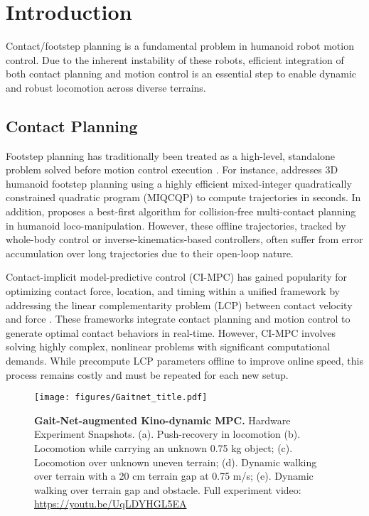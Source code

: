 
\section{Introduction}
\label{sec:Introduction}


Contact/footstep planning is a fundamental problem in humanoid robot motion control. Due to the inherent instability of these robots, 
efficient integration of both contact planning and motion control is an essential step to enable dynamic and robust locomotion across diverse terrains.

\subsection{Contact Planning}
Footstep planning has traditionally been treated as a high-level, standalone problem solved before motion control execution \cite{deits2014footstep, bouyarmane2012humanoid, carpentier2016versatile, ponton2021efficient}. For instance, \citet{deits2014footstep} addresses 3D humanoid footstep planning using a highly efficient mixed-integer quadratically constrained quadratic program (MIQCQP) to compute trajectories in seconds. In addition, \citet{bouyarmane2012humanoid} proposes a best-first algorithm for collision-free multi-contact planning in humanoid loco-manipulation. However, these offline trajectories, tracked by whole-body control or inverse-kinematics-based controllers, often suffer from error accumulation over long trajectories due to their open-loop nature.

Contact-implicit model-predictive control (CI-MPC) has gained popularity for optimizing contact force, location, and timing within a unified framework by addressing the linear complementarity problem (LCP) between contact velocity and force \cite{kim2023contact, le2024fast, kong2023hybrid}. These frameworks integrate contact planning and motion control to generate optimal contact behaviors in real-time. However, CI-MPC involves solving highly complex, nonlinear problems with significant computational demands. While \citet{le2024fast} precompute LCP parameters offline to improve online speed, this process remains costly and must be repeated for each new setup.

\begin{figure}[!t]
\vspace{0cm}
    \center
    \texttt{[image: figures/Gaitnet\_title.pdf]}
    \caption{{\bfseries Gait-Net-augmented Kino-dynamic MPC.} Hardware Experiment Snapshots. (a). Push-recovery in locomotion (b). Locomotion while carrying an unknown 0.75 kg object; (c). Locomotion over unknown uneven terrain; (d). Dynamic walking over terrain with a 20 cm terrain gap at 0.75 m/s; (e). Dynamic walking over terrain gap and obstacle. Full experiment video: \url{https://youtu.be/UqLDYHGL5EA} }
    \label{fig:title}
    \vspace{-0.2cm}
\end{figure}

